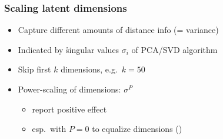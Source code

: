 \documentclass[t]{beamer} %
\begin{document}
\begin{frame}
  \frametitle{Scaling latent dimensions}

  \begin{itemize}
  \item Capture different amounts of distance info (= variance)
  \item Indicated by \h{singular values} $\sigma_i$ of PCA/SVD algorithm
  \item<2-> Skip first $k$ dimensions, e.g.\ $k = 50$ \citep{Bullinaria:Levy:12}
  \item<3-> Power-scaling of dimensions: $\sigma^P$ \citep{Caron:01}
    \begin{itemize}
    \item \citet{Bullinaria:Levy:12} report positive effect
    \item<4-> esp.\ with $P = 0$ to equalize dimensions ()
    \end{itemize}
  \end{itemize}


\end{frame}
\end{document}
